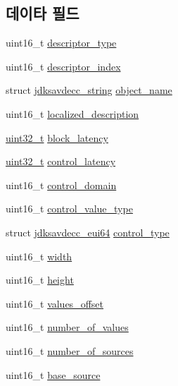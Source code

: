\subsection*{데이타 필드}
\begin{DoxyCompactItemize}
\item 
uint16\+\_\+t \hyperlink{structjdksavdecc__descriptor__matrix_ab7c32b6c7131c13d4ea3b7ee2f09b78d}{descriptor\+\_\+type}
\item 
uint16\+\_\+t \hyperlink{structjdksavdecc__descriptor__matrix_a042bbc76d835b82d27c1932431ee38d4}{descriptor\+\_\+index}
\item 
struct \hyperlink{structjdksavdecc__string}{jdksavdecc\+\_\+string} \hyperlink{structjdksavdecc__descriptor__matrix_a7d1f5945a13863b1762fc6db74fa8f80}{object\+\_\+name}
\item 
uint16\+\_\+t \hyperlink{structjdksavdecc__descriptor__matrix_a0926f846ca65a83ad5bb06b4aff8f408}{localized\+\_\+description}
\item 
\hyperlink{parse_8c_a6eb1e68cc391dd753bc8ce896dbb8315}{uint32\+\_\+t} \hyperlink{structjdksavdecc__descriptor__matrix_ae2e9f0088d5e900b610d1b2818dfc559}{block\+\_\+latency}
\item 
\hyperlink{parse_8c_a6eb1e68cc391dd753bc8ce896dbb8315}{uint32\+\_\+t} \hyperlink{structjdksavdecc__descriptor__matrix_ab2bd4639caaf9a8078b68368afbd63b6}{control\+\_\+latency}
\item 
uint16\+\_\+t \hyperlink{structjdksavdecc__descriptor__matrix_a8937b22996b7c28ae209f29fe777f03a}{control\+\_\+domain}
\item 
uint16\+\_\+t \hyperlink{structjdksavdecc__descriptor__matrix_a62a5b88a920cc4d09508de6fc60d9a63}{control\+\_\+value\+\_\+type}
\item 
struct \hyperlink{structjdksavdecc__eui64}{jdksavdecc\+\_\+eui64} \hyperlink{structjdksavdecc__descriptor__matrix_affec595f0ec2a4ae7a3cece71d05adcb}{control\+\_\+type}
\item 
uint16\+\_\+t \hyperlink{structjdksavdecc__descriptor__matrix_ad0eab1042455a2067c812ab8071d5376}{width}
\item 
uint16\+\_\+t \hyperlink{structjdksavdecc__descriptor__matrix_a81c9f8d0b8c3b49d770be14dbe9f0d37}{height}
\item 
uint16\+\_\+t \hyperlink{structjdksavdecc__descriptor__matrix_a2987071ee0b81f35817e48a0dc92ad76}{values\+\_\+offset}
\item 
uint16\+\_\+t \hyperlink{structjdksavdecc__descriptor__matrix_a1c32421ead62b8a032c4346688cd9b69}{number\+\_\+of\+\_\+values}
\item 
uint16\+\_\+t \hyperlink{structjdksavdecc__descriptor__matrix_a1af3a7f3729937d5da218737ba5b2483}{number\+\_\+of\+\_\+sources}
\item 
uint16\+\_\+t \hyperlink{structjdksavdecc__descriptor__matrix_a2d8374af2d34db97d440b2e38171dc5f}{base\+\_\+source}
\end{DoxyCompactItemize}


